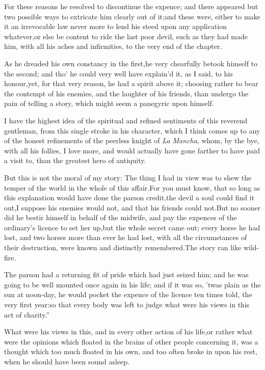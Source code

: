 \documentclass{article}
\begin{document}
For these reasons he resolved to discontinue the expence; and
there appeared but two possible ways to extricate him clearly out
of it;\tsk  and these were, either to make it an irrevocable law
never more to lend his steed upon any application
whatever,\tsk  or else be content to ride the last poor devil,
such as they had made him, with all his aches and infirmities, to
the very end of the chapter.

As he dreaded his own constancy in the first,\tsk  he very
chearfully betook himself to the second; and tho’ he could very
well have explain’d it, as I said, to his honour,\tsk  yet, for
that very reason, he had a spirit above it; choosing rather to bear
the contempt of his enemies, and the laughter of his friends, than
undergo the pain of telling a story, which might seem a panegyric
upon himself.\\

I have the highest idea of the spiritual and refined sentiments of this reverend
gentleman, from this single stroke in his character, which I think comes up to any
of the honest refinements of the peerless knight of \textit{La Mancha}, whom, by the
bye, with all his follies, I love more, and would actually have gone farther to have
paid a visit to, than the greatest hero of antiquity.

But this is not the moral of my story: The thing I had in view
was to shew the temper of the world in the whole of this
affair.\tsk  For you must know, that so long as this explanation
would have done the parson credit,\tsk  the devil a soul could
find it out,\tsk  I suppose his enemies would not, and that his
friends could not.\tsh  But no sooner did he bestir himself in
behalf of the midwife, and pay the expences of the ordinary’s
licence to set her up,\tsk  but the whole secret came out; every
horse he had lost, and two horses more than ever he had lost,
with all the circumstances of their destruction, were known and
distinctly remembered.\tsk  The story ran like wild-fire.\tsk
\begin{story}{The parson had}
a returning fit of pride which had just seized
him; and he was going to be well mounted once again in his life;
and if it was so, ’twas plain as the sun at noon-day, he would
pocket the expence of the licence ten times told, the very first
year:\tsk  so that every body was left to judge what were his
views in this act of charity.”
\end{story}

\vspace\parskip
What were his views in this, and in every other action of his
life,\tsk  or rather what were the opinions which floated in the
brains of other people concerning it, was a thought which too much
floated in his own, and too often broke in upon his rest, when he
should have been sound asleep.
\end{document}
